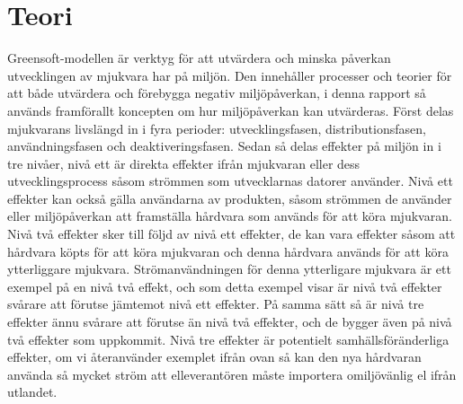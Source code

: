 \section{Teori}
\label{sec:joel_a-theory}

Greensoft-modellen är verktyg för att utvärdera och minska påverkan utvecklingen av mjukvara har på miljön. Den innehåller processer och teorier för att både utvärdera och förebygga negativ miljöpåverkan, i denna rapport så används framförallt koncepten om hur miljöpåverkan kan utvärderas. Först delas mjukvarans livslängd in i fyra perioder: utvecklingsfasen, distributionsfasen, användningsfasen och deaktiveringsfasen. Sedan så delas effekter på miljön in i tre nivåer, nivå ett är direkta effekter ifrån mjukvaran eller dess utvecklingsprocess såsom strömmen som utvecklarnas datorer använder. Nivå ett effekter kan också gälla användarna av produkten, såsom strömmen de använder eller miljöpåverkan att framställa hårdvara som används för att köra mjukvaran. Nivå två effekter sker till följd av nivå ett effekter, de kan vara effekter såsom att hårdvara köpts för att köra mjukvaran och denna hårdvara används för att köra ytterliggare mjukvara. Strömanvändningen för denna ytterligare mjukvara är ett exempel på en nivå två effekt, och som detta exempel visar är nivå två effekter svårare att förutse jämtemot nivå ett effekter. På samma sätt så är nivå tre effekter ännu svårare att förutse än nivå två effekter, och de bygger även på nivå två effekter som uppkommit. Nivå tre effekter är potentielt samhällsföränderliga effekter, om vi återanvänder exemplet ifrån ovan så kan den nya hårdvaran använda så mycket ström att elleverantören måste importera omiljövänlig el ifrån utlandet.